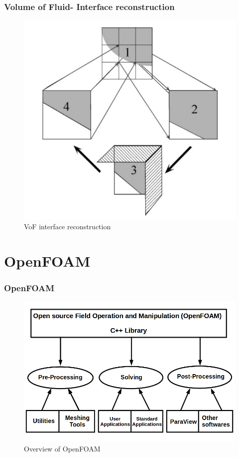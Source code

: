 \documentclass{beamer}
\begin{document}

\begin{frame}
\frametitle{Volume of Fluid- Interface reconstruction}
\begin{figure}[h]  
\begin{center}  
\includegraphics[scale=0.28]{6.png}
\caption{\tiny VoF interface reconstruction }
\end{center}  
\end{figure}

\end{frame}

\section{OpenFOAM}
\begin{frame}
\frametitle{OpenFOAM}
\begin{figure}[h]  
\begin{center}  
\includegraphics[scale=0.25]{7.png}
\caption{\tiny Overview of OpenFOAM }
\end{center}  
\end{figure}

\end{frame}
\end{document}
